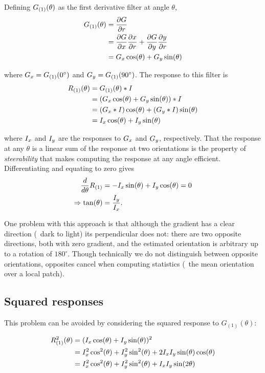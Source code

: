 Defining $G_{(1)}(\theta)$ as the first derivative filter at angle $\theta$,
%
\begin{align}
G_{(1)}(\theta)
	&= 	\frac{\partial G}{\partial r} \\
	&= 	\frac{\partial G}{\partial x}\frac{\partial x}{\partial r} +
			\frac{\partial G}{\partial y}\frac{\partial y}{\partial r} \\
	&= 	G_x \cos(\theta) + G_y \sin(\theta)
\label{e:dG}
\end{align}

\noindent where $G_x = G_{(1)}(0^\circ)$ and $G_y = G_{(1)}(90^\circ)$. The response to this filter is
%
\begin{align}
R_{(1)}(\theta)
	&= 	G_{(1)}(\theta) \ast I \\
	&=	(G_x \cos(\theta) + G_y \sin(\theta)) \ast I \\
	&=	(G_x \ast I) \cos(\theta) + (G_y \ast I) \sin(\theta) \\
	&=	I_x \cos(\theta) + I_y \sin(\theta)
\label{e:R1}
\end{align}

\noindent where $I_x$ and $I_y$ are the responses to $G_x$ and $G_y$, respectively. That the response at any $\theta$ is a linear sum of the response at two orientations is the property of \emph{steerability} that makes computing the response at any angle efficient. Differentiating and equating to zero gives
%
\begin{align}
\frac{d}{d\theta}R_{(1)}
	&= -I_x \sin(\theta) + I_y \cos(\theta) = 0 \\
\Rightarrow \tan(\theta)
	&= \frac{I_y}{I_x}.
\label{e:t1}
\end{align}

One problem with this approach is that although the gradient has a clear direction (\eg~dark to light) its perpendicular does not: there are two opposite directions, both with zero gradient, and the estimated orientation is arbitrary up to a rotation of $180^\circ$. Though technically we do not distinguish between opposite orientations, opposites cancel when computing statistics (\eg~the mean orientation over a local patch). 


\subsection{Squared responses}
This problem can be avoided by considering the squared response to $G_{(1)}(\theta)$:

\begin{align}
R_{(1)}^2(\theta)
	&=	(I_x \cos(\theta) + I_y \sin(\theta))^2 \\
	&= 	I_x^2 \cos^2(\theta)+I_y^2 \sin^2(\theta)+2I_xI_y\sin(\theta)\cos(\theta) \\
	&= 	I_x^2 \cos^2(\theta)+I_y^2 \sin^2(\theta)+I_xI_y\sin(2\theta)
\label{e:R1sqr}
\end{align}

